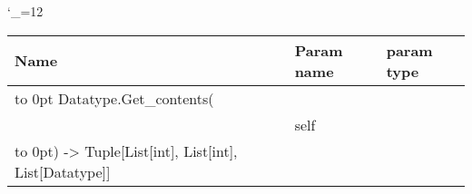 \begingroup \catcode`\_=12 \tt
\begin{tabular}{lll}
\toprule
\textrm{Name}&\textrm{Param name}&\textrm{param type}\\
\midrule
\hbox to 0pt {Datatype.Get_contents(\hss}\\
& self\\
\hbox to 0pt{) -> Tuple[List[int], List[int], List[Datatype]]\hss}\\
\bottomrule
\end{tabular}
\endgroup
